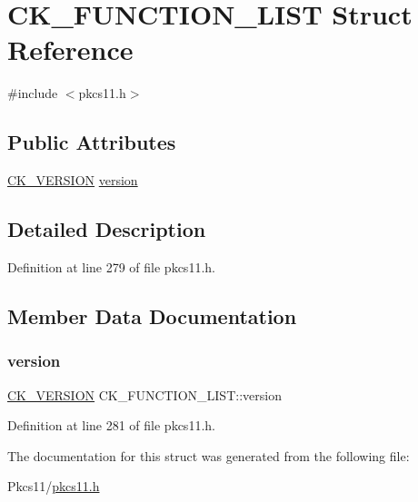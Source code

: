 \hypertarget{struct_c_k___f_u_n_c_t_i_o_n___l_i_s_t}{}\section{C\+K\+\_\+\+F\+U\+N\+C\+T\+I\+O\+N\+\_\+\+L\+I\+ST Struct Reference}
\label{struct_c_k___f_u_n_c_t_i_o_n___l_i_s_t}


{\ttfamily \#include $<$pkcs11.\+h$>$}

\subsection*{Public Attributes}
\begin{DoxyCompactItemize}
\item 
\hyperlink{struct_c_k___v_e_r_s_i_o_n}{C\+K\+\_\+\+V\+E\+R\+S\+I\+ON} \hyperlink{struct_c_k___f_u_n_c_t_i_o_n___l_i_s_t_a2588758f026a49100546d9868754a6c8}{version}
\end{DoxyCompactItemize}


\subsection{Detailed Description}


Definition at line 279 of file pkcs11.\+h.



\subsection{Member Data Documentation}
\mbox{\label{struct_c_k___f_u_n_c_t_i_o_n___l_i_s_t_a2588758f026a49100546d9868754a6c8}} 
\subsubsection{\texorpdfstring{version}{version}}
{\footnotesize\ttfamily \hyperlink{struct_c_k___v_e_r_s_i_o_n}{C\+K\+\_\+\+V\+E\+R\+S\+I\+ON} C\+K\+\_\+\+F\+U\+N\+C\+T\+I\+O\+N\+\_\+\+L\+I\+S\+T\+::version}



Definition at line 281 of file pkcs11.\+h.



The documentation for this struct was generated from the following file\+:\begin{DoxyCompactItemize}
\item 
Pkcs11/\hyperlink{pkcs11_8h}{pkcs11.\+h}\end{DoxyCompactItemize}
